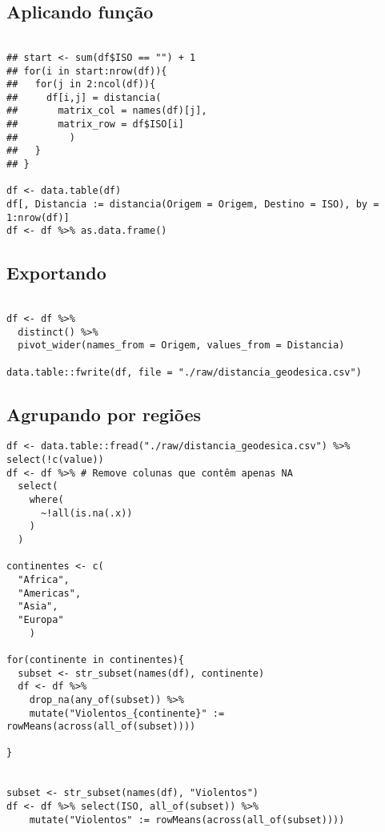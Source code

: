 \documentclass[11pt]{article}
\begin{document}
\subsection*{Aplicando função}
\label{sec:org4340ccc}

\begin{verbatim}

## start <- sum(df$ISO == "") + 1
## for(i in start:nrow(df)){
##   for(j in 2:ncol(df)){
##     df[i,j] = distancia(
##       matrix_col = names(df)[j],
##       matrix_row = df$ISO[i]
##         )
##   }
## }

df <- data.table(df)
df[, Distancia := distancia(Origem = Origem, Destino = ISO), by = 1:nrow(df)]
df <- df %>% as.data.frame()
\end{verbatim}

\subsection*{Exportando}
\label{sec:org8fcd006}

\begin{verbatim}

df <- df %>%
  distinct() %>%
  pivot_wider(names_from = Origem, values_from = Distancia)
    
data.table::fwrite(df, file = "./raw/distancia_geodesica.csv")
\end{verbatim}

\subsection*{Agrupando por regiões}
\label{sec:org86e0de4}

\begin{verbatim}
df <- data.table::fread("./raw/distancia_geodesica.csv") %>% select(!c(value))
df <- df %>% # Remove colunas que contêm apenas NA
  select(
    where(
      ~!all(is.na(.x))
    )
  )
    
continentes <- c(
  "Africa",
  "Americas",
  "Asia",
  "Europa"
    )

for(continente in continentes){
  subset <- str_subset(names(df), continente)
  df <- df %>%
    drop_na(any_of(subset)) %>%
    mutate("Violentos_{continente}" := rowMeans(across(all_of(subset))))
  
}
    
    
subset <- str_subset(names(df), "Violentos")
df <- df %>% select(ISO, all_of(subset)) %>%
    mutate("Violentos" := rowMeans(across(all_of(subset))))
\end{verbatim}
\end{document}

